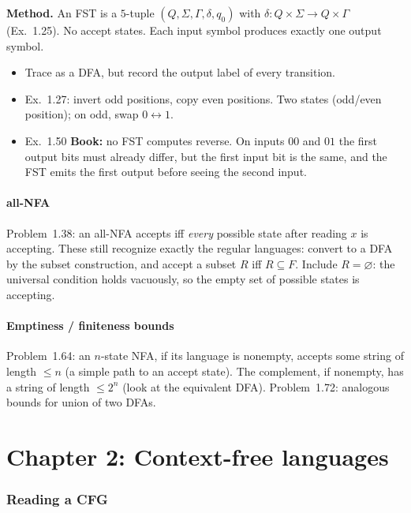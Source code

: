 \documentclass[11pt,a4paper]{article}
\begin{document}
\textbf{Method.}
An FST is a $5$-tuple $(Q,\Sigma,\Gamma,\delta,q_0)$ with
$\delta:Q\times\Sigma\to Q\times\Gamma$ (Ex.~1.25). No accept
states. Each input symbol produces exactly one output symbol.

\begin{itemize}[nosep]
  \item Trace as a DFA, but record the output label of every
        transition.
  \item Ex.~1.27: invert odd positions, copy even positions. Two
        states (odd/even position); on odd, swap $0\leftrightarrow 1$.
  \item Ex.~1.50 \textbf{Book:} no FST computes reverse. On inputs
        $00$ and $01$ the first output bits must already differ, but
        the first input bit is the same, and the FST emits the first
        output before seeing the second input.
\end{itemize}

\subsection{all-NFA}

Problem~1.38: an all-NFA accepts iff \emph{every} possible state
after reading $x$ is accepting. These still recognize exactly the
regular languages: convert to a DFA by the subset construction, and
accept a subset $R$ iff $R\subseteq F$. Include $R=\varnothing$:
the universal condition holds vacuously, so the empty set of
possible states is accepting.

\subsection{Emptiness / finiteness bounds}

Problem~1.64: an $n$-state NFA, if its language is nonempty, accepts
some string of length $\le n$ (a simple path to an accept state).
The complement, if nonempty, has a string of length $\le 2^n$
(look at the equivalent DFA). Problem~1.72: analogous bounds for
union of two DFAs.

\part{Chapter 2: Context-free languages}

\section{Reading a CFG}
\label{type:cfg-read}
\end{document}
